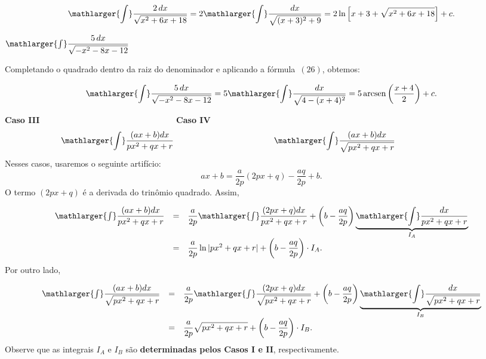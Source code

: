\cleardoublepage\documentclass[../main.tex]{subfiles}
\begin{document}
\begin{ex}
\begin{compactenum}[a)]
\begin{solution}
\[ \mathlarger{\int}\dfrac{2\,dx}{\sqrt{x^2+6x+18}} = 2\mathlarger{\int}\dfrac{dx}{\sqrt{(x+3)^2+9}} = 2 \ln \left[ x+3+ \sqrt{x^2+6x+18} \right]+c . \]
\end{solution}
\item \(\mathlarger{\int}\dfrac{5\,dx}{\sqrt{-x^2-8x-12}}\)\\

\begin{solut}
Completando o quadrado dentro da raiz do denominador e aplicando a fórmula \(\,(26)\), obtemos:

\[ \mathlarger{\int}\dfrac{5\,dx}{\sqrt{-x^2-8x-12}}= 5\mathlarger{\int}\dfrac{dx}{\sqrt{4 -(x+4)^2}}= 5 \,{\rm arcsen}\left(\dfrac{x+4}{2} \right)+c. \]
\end{solut}
\end{compactenum}
\end{ex}
\textbf{\hypertarget{TrinQuadCasoIII}{Caso III}} \(\qquad \qquad \qquad \qquad\qquad \qquad \qquad \qquad\)\textbf{\hypertarget{TrinQuadCasoIV}{Caso IV}}
\[ \mathlarger{\int}\dfrac{(ax+b)dx}{px^2+qx+r}\qquad \qquad \qquad \qquad \qquad \qquad\mathlarger{\int}\dfrac{(ax+b)dx}{\sqrt{px^2+qx+r}}\qquad \qquad \qquad \qquad \]
Nesses casos, usaremos o seguinte artifício:
\[ ax+b = \dfrac{a}{2p}(2px+q) - \dfrac{aq}{2p}+b. \]
O termo \((2px+q)\) é a derivada do trinômio quadrado. Assim,

\[ \begin{array}{rcl} \mathlarger{\int}\dfrac{(ax+b)dx}{px^2+qx+r}&=& \dfrac{a}{2p} \mathlarger{\int}\dfrac{(2px+q)dx}{px^2+qx+r}+ \left(b-\dfrac{aq}{2p} \right)\underbrace{\mathlarger{\int}\dfrac{dx}{px^2+qx+r}}_{I_A}\\ &=& \dfrac{a}{2p}\ln |px^2+qx+r| + \left(b-\dfrac{aq}{2p} \right)\cdot I_A. \end{array} \]
Por outro lado,

\[ \begin{array}{rcl} \mathlarger{\int}\dfrac{(ax+b)dx}{\sqrt{px^2+qx+r}}&=& \dfrac{a}{2p} \mathlarger{\int}\dfrac{(2px+q)dx}{\sqrt{px^2+qx+r}}+ \left(b-\dfrac{aq}{2p} \right)\underbrace{\mathlarger{\int}\dfrac{dx}{\sqrt{px^2+qx+r}}}_{I_B}\\ &=& \dfrac{a}{2p} \sqrt{px^2+qx+r} + \left(b-\dfrac{aq}{2p} \right)\cdot I_B. \end{array} \]
Observe que as integrais \(I_A\) e \(I_B\) são \textbf{determinadas pelos Casos I e II}, respectivamente.
\end{document}
